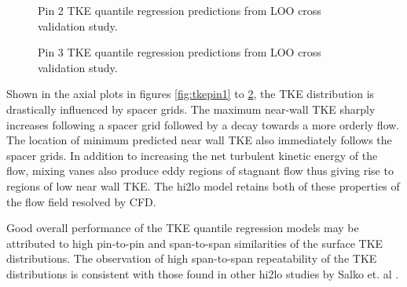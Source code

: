 \begin{figure}[H]%
    \captionsetup[subfigure]{justification=centering}
    \centering
    \hspace*{-1.0em}%
    \caption[Q-Q LOO TKE pin 2 results.]{Pin 2 TKE quantile regression predictions from LOO cross validation study.}%
    \label{fig:tkepin2}%
\end{figure}

\begin{figure}[H]%
    \captionsetup[subfigure]{justification=centering}
    \centering
    \hspace*{-1.0em}%
    \caption[Q-Q LOO TKE pin 3 results.]{Pin 3 TKE quantile regression predictions from LOO cross validation study.}%
    \label{fig:tkepin3}%
\end{figure}

Shown in the axial plots in figures \ref{fig:tkepin1} to \ref{fig:tkepin3}, the TKE distribution is drastically influenced by spacer grids.  The maximum near-wall TKE sharply increases following a spacer grid followed by a decay towards a more orderly flow.  The location of minimum predicted near wall TKE also immediately follows the spacer grids.  In addition to increasing the net turbulent kinetic energy of the flow, mixing vanes also produce eddy regions of stagnant flow thus giving rise to regions of low near wall TKE.  The hi2lo model retains both of these properties of the flow field resolved by CFD.

Good overall performance of the TKE quantile regression models may be attributed to high pin-to-pin and span-to-span similarities of the surface TKE distributions. The observation of high span-to-span repeatability of the TKE distributions is consistent with those found in other hi2lo studies by Salko et. al \cite{salko17}.

